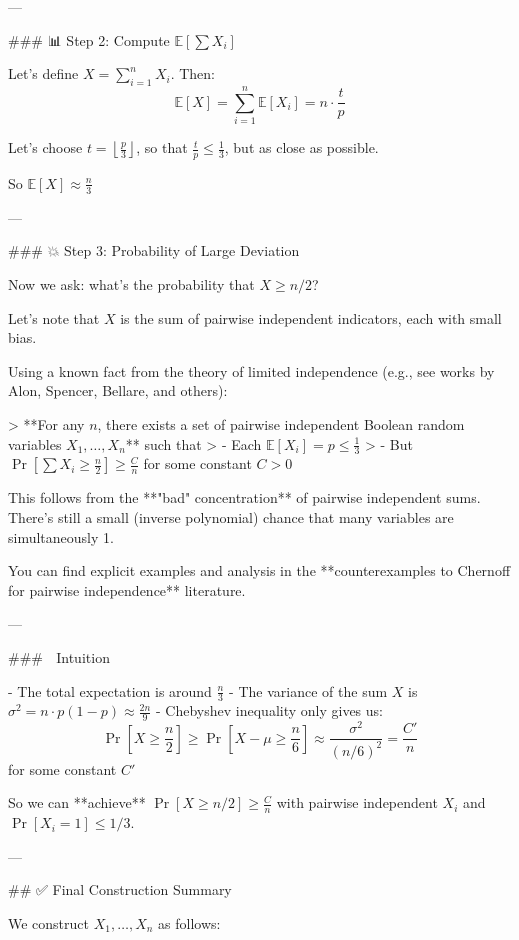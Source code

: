 ---

### 📊 Step 2: Compute \( \mathbb{E}\left[\sum X_i\right] \)

Let's define \( X = \sum_{i=1}^n X_i \). Then:
\[
\mathbb{E}[X] = \sum_{i=1}^n \mathbb{E}[X_i] = n \cdot \frac{t}{p}
\]

Let's choose \( t = \left\lfloor \frac{p}{3} \right\rfloor \), so that \( \frac{t}{p} \le \frac{1}{3} \), but as close as possible.

So \( \mathbb{E}[X] \approx \frac{n}{3} \)

---

### 💥 Step 3: Probability of Large Deviation

Now we ask: what's the probability that \( X \ge n/2 \)?

Let's note that \( X \) is the sum of pairwise independent indicators, each with small bias.

Using a known fact from the theory of limited independence (e.g., see works by Alon, Spencer, Bellare, and others):

> **For any \( n \), there exists a set of pairwise independent Boolean random variables \( X_1, \dots, X_n \)** such that  
> - Each \( \mathbb{E}[X_i] = p \le \frac{1}{3} \)  
> - But \( \Pr\left[ \sum X_i \ge \frac{n}{2} \right] \ge \frac{C}{n} \) for some constant \( C > 0 \)

This follows from the **"bad" concentration** of pairwise independent sums. There's still a small (inverse polynomial) chance that many variables are simultaneously 1.

You can find explicit examples and analysis in the **counterexamples to Chernoff for pairwise independence** literature.

---

### 🔑 Intuition

- The total expectation is around \( \frac{n}{3} \)
- The variance of the sum \( X \) is \( \sigma^2 = n \cdot p(1-p) \approx \frac{2n}{9} \)
- Chebyshev inequality only gives us:
  \[
  \Pr\left[ X \ge \frac{n}{2} \right] \ge \Pr\left[ X - \mu \ge \frac{n}{6} \right] \approx \frac{\sigma^2}{(n/6)^2} = \frac{C'}{n}
  \]
  for some constant \( C' \)

So we can **achieve** \( \Pr[X \ge n/2] \ge \frac{C}{n} \) with pairwise independent \( X_i \) and \( \Pr[X_i = 1] \le 1/3 \).

---

## ✅ Final Construction Summary

We construct \( X_1, \dots, X_n \) as follows:

